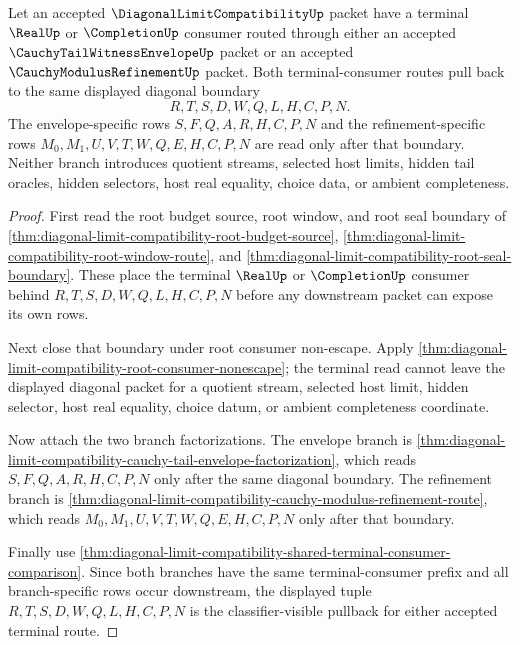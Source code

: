 \begin{theorem}
\label{thm:diagonal-limit-compatibility-envelope-refinement-pullback}
Let an accepted $\DiagonalLimitCompatibilityUp$ packet have a terminal $\RealUp$ or $\CompletionUp$ consumer routed through either an accepted $\CauchyTailWitnessEnvelopeUp$ packet or an accepted $\CauchyModulusRefinementUp$ packet. Both terminal-consumer routes pull back to the same displayed diagonal boundary
$$
R,T,S,D,W,Q,L,H,C,P,N.
$$
The envelope-specific rows $S,F,Q,A,R,H,C,P,N$ and the refinement-specific rows $M_0,M_1,U,V,T,W,Q,E,H,C,P,N$ are read only after that boundary. Neither branch introduces quotient streams, selected host limits, hidden tail oracles, hidden selectors, host real equality, choice data, or ambient completeness.
\end{theorem}
\begin{proof}
First read the root budget source, root window, and root seal boundary of \autoref{thm:diagonal-limit-compatibility-root-budget-source}, \autoref{thm:diagonal-limit-compatibility-root-window-route}, and \autoref{thm:diagonal-limit-compatibility-root-seal-boundary}. These place the terminal $\RealUp$ or $\CompletionUp$ consumer behind $R,T,S,D,W,Q,L,H,C,P,N$ before any downstream packet can expose its own rows.

Next close that boundary under root consumer non-escape. Apply \autoref{thm:diagonal-limit-compatibility-root-consumer-nonescape}; the terminal read cannot leave the displayed diagonal packet for a quotient stream, selected host limit, hidden selector, host real equality, choice datum, or ambient completeness coordinate.

Now attach the two branch factorizations. The envelope branch is \autoref{thm:diagonal-limit-compatibility-cauchy-tail-envelope-factorization}, which reads $S,F,Q,A,R,H,C,P,N$ only after the same diagonal boundary. The refinement branch is \autoref{thm:diagonal-limit-compatibility-cauchy-modulus-refinement-route}, which reads $M_0,M_1,U,V,T,W,Q,E,H,C,P,N$ only after that boundary.

Finally use \autoref{thm:diagonal-limit-compatibility-shared-terminal-consumer-comparison}. Since both branches have the same terminal-consumer prefix and all branch-specific rows occur downstream, the displayed tuple $R,T,S,D,W,Q,L,H,C,P,N$ is the classifier-visible pullback for either accepted terminal route.
\end{proof}

